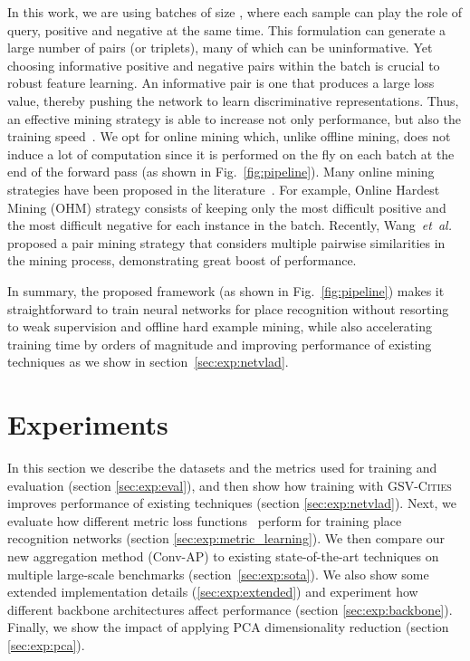 \documentclass{article}
\newcommand{\etal}{\textit{et~al.}}
\begin{document}
In this work, we are using batches of size , where each sample can play the role of query, positive and negative at the same time. This formulation can generate a large number of pairs (or triplets), many of which can be uninformative. Yet choosing informative positive and negative pairs within the batch is crucial to robust feature learning. An informative pair is one that produces a large loss value, thereby pushing the network to learn discriminative representations. Thus, an effective mining strategy is able to increase not only performance, but also the training speed~\cite{kaya2019deep}. We opt for online mining which, unlike offline mining, does not induce a lot of computation since it is performed on the fly on each batch at the end of the forward pass (as shown in Fig.~\ref{fig:pipeline}). Many online mining strategies have been proposed in the literature~\cite{musgrave2020pytorch}. For example, Online Hardest Mining (OHM) strategy \cite{hermans2017defense} consists of keeping only the most difficult positive and the most difficult negative for each instance in the batch. Recently, Wang~\etal~\cite{wang2019multi} proposed a pair mining strategy that considers multiple pairwise similarities in the mining process, demonstrating great boost of performance.

In summary, the proposed framework (as shown in Fig.~\ref{fig:pipeline}) makes it straightforward to train neural networks for place recognition without resorting to weak supervision and offline hard example mining, while also accelerating training time by orders of magnitude and improving performance of existing techniques as we show in section~\ref{sec:exp:netvlad}.






\section{Experiments}
In this section we describe the datasets and the metrics used for training and evaluation (section \ref{sec:exp:eval}), and then show how training with \textsc{GSV-Cities} improves performance of existing techniques (section \ref{sec:exp:netvlad}). Next, we evaluate how different metric loss functions~\cite{musgrave2020pytorch} perform for training place recognition networks (section \ref{sec:exp:metric_learning}). We then compare our new aggregation method (Conv-AP) to existing state-of-the-art techniques on multiple large-scale benchmarks (\mbox{section \ref{sec:exp:sota}}). We also show some extended implementation details (\ref{sec:exp:extended}) and experiment how different backbone architectures affect performance (section \ref{sec:exp:backbone}). Finally, we show the impact of applying PCA dimensionality reduction (section \ref{sec:exp:pca}).
\end{document}
